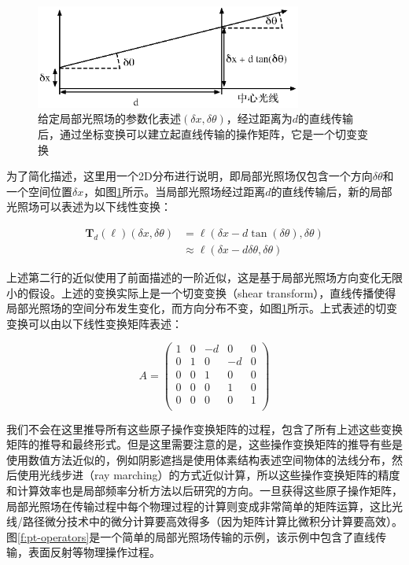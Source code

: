 \begin{figure}
\begin{center}
	\includegraphics[width=0.78\textwidth]{figures/pt/travel}
\end{center}
	\caption{给定局部光照场的参数化表述$(\delta x,\delta\theta)$，经过距离为$d$的直线传输后，通过坐标变换可以建立起直线传输的操作矩阵，它是一个切变变换}
	\label{f:pt-travel}
\end{figure}

为了简化描述，这里用一个2D分布进行说明，即局部光照场仅包含一个方向$\delta\theta$和一个空间位置$\delta x$，如图\ref{f:pt-travel}所示。当局部光照场经过距离$d$的直线传输后，新的局部光照场可以表述为以下线性变换：

\begin{equation}
	\begin{aligned}
		\mathbf{T}_d(\ell)(\delta x,\delta\theta)&=\ell(\delta x-d\tan{(\delta\theta)},\delta\theta)\\
		&\approx\ell(\delta x-d\delta\theta,\delta\theta)
	\end{aligned}
\end{equation}

\noindent 上述第二行的近似使用了前面描述的一阶近似，这是基于局部光照场方向变化无限小的假设。上述的变换实际上是一个切变变换（shear transform），直线传播使得局部光照场的空间分布发生变化，而方向分布不变，如图\ref{f:pt-travel}所示。上式表述的切变变换可以由以下线性变换矩阵表述：

\begin{equation}
	A=\begin{pmatrix}
		1 & 0 & -d & 0 & 0 \\
		0 & 1 & 0 & -d & 0 \\
		0 & 0 & 1 & 0 & 0 \\
		0 & 0 & 0 & 1 & 0 \\
		0 & 0 & 0 & 0 & 1 \\
	\end{pmatrix}
\end{equation}

我们不会在这里推导所有这些原子操作变换矩阵的过程，\cite{a:AFrequencyAnalysisofLightTransportfromtheorytoimplementation}包含了所有上述这些变换矩阵的推导和最终形式。但是这里需要注意的是，这些操作变换矩阵的推导有些是使用数值方法近似的，例如阴影遮挡是使用体素结构表述空间物体的法线分布，然后使用光线步进（ray marching）的方式近似计算，所以这些操作变换矩阵的精度和计算效率也是局部频率分析方法以后研究的方向。一旦获得这些原子操作矩阵，局部光照场在传输过程中每个物理过程的计算则变成非常简单的矩阵运算，这比光线/路径微分技术中的微分计算要高效得多（因为矩阵计算比微积分计算要高效）。图\ref{f:pt-operators}是一个简单的局部光照场传输的示例，该示例中包含了直线传输，表面反射等物理操作过程。

